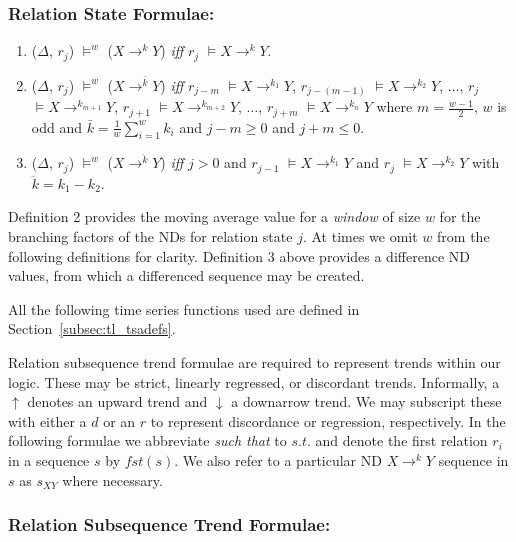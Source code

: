 \subsubsection{Relation State Formulae:}
\begin{enumerate}

\item\label{item:nd} ($\Delta$, $r_j$) $\models^w$ ($X
\to^{k} Y$) { \em iff } $r_{j}$ $\models X \to^{k} Y$.

\item\label{item:ma} ($\Delta$, $r_j$) $\models^w$ ($X
\to^{\bar{{k}}} Y$) { \em iff } $r_{j-m}$
$\models X \to^{{k}_1} Y$,  $r_{j-(m-1)}$
$\models X \to^{{k}_2} Y$, $\ldots$,  $r_{j}$
$\models X \to^{{k}_{m+1}} Y$,  $r_{j+1}$ 
$\models X \to^{{k}_{m+2}} Y$, $\ldots$,  $r_{j+m}$
$\models X \to^{{k}_n} Y$ where $m = \frac{w-1}{2}$, $w$ is odd
and $\bar{{k}} = \frac{1}{w} \sum_{i = 1}^{w} {k}_i$
and $j - m \ge 0$ and $j + m \le 0$.

\item\label{item:diff} ($\Delta$, $r_j$) $\models^w$ ($X 
{\to}^{\ddot{{k}}}  Y$) { \em iff } $j > 0$ and $r_{j-1}$
$\models X \to^{{k}_1} Y$ and  $r_{j}$
$\models X \to^{{k}_2} Y$ with $\ddot{{k}} = {{k}_1} -{{k}_2}$.


\end{enumerate}

Definition 2 provides the moving average value for a {\em window} of size
$w$ for the branching
factors of the NDs for relation state $j$. At times we omit $w$ from the
following definitions for clarity. Definition 3 above provides a
difference ND values, from which a differenced sequence may be created.

All the following time
series functions used are defined in Section~\ref{subsec:tl_tsadefs}.

Relation subsequence trend formulae are required to represent trends
within our logic. These may be strict, linearly regressed, or
discordant trends. Informally, a $\uparrow$ denotes an upward trend
and $\downarrow$ a downarrow trend. We may subscript these with either
a $d$ or an $r$ to represent discordance or regression, respectively. 
In the following formulae we abbreviate {\em such that} to $s.t.$ and
denote the first relation $r_i$ in a sequence $s$ by $fst(s)$. We also
refer to a particular ND $X \to^k Y$ sequence in 
$s$ as $s_{XY}$ where necessary.

\subsubsection{Relation Subsequence Trend Formulae:}


